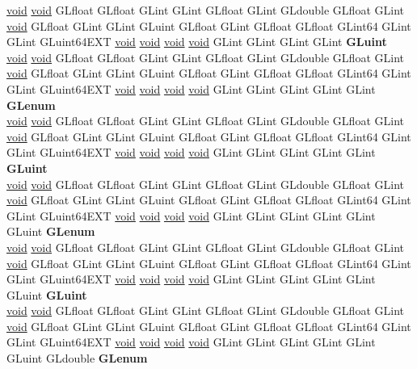 \begin{DoxyCompactItemize}
\begin{tabbing}
\>\hyperlink{interfacevoid}{void} \hyperlink{interfacevoid}{void} GLfloat GLfloat GLint GLint GLfloat GLint GLdouble GLfloat GLint \hyperlink{interfacevoid}{void} GLfloat GLint GLint GLuint GLfloat GLint GLfloat GLfloat GLint64 GLint GLint GLuint64EXT \hyperlink{interfacevoid}{void} \hyperlink{interfacevoid}{void} \hyperlink{interfacevoid}{void} \hyperlink{interfacevoid}{void} GLint GLint GLint GLint {\bfseries GLuint}\\
\>\hyperlink{interfacevoid}{void} \hyperlink{interfacevoid}{void} GLfloat GLfloat GLint GLint GLfloat GLint GLdouble GLfloat GLint \hyperlink{interfacevoid}{void} GLfloat GLint GLint GLuint GLfloat GLint GLfloat GLfloat GLint64 GLint GLint GLuint64EXT \hyperlink{interfacevoid}{void} \hyperlink{interfacevoid}{void} \hyperlink{interfacevoid}{void} \hyperlink{interfacevoid}{void} GLint GLint GLint GLint GLint {\bfseries GLenum}\\
\>\hyperlink{interfacevoid}{void} \hyperlink{interfacevoid}{void} GLfloat GLfloat GLint GLint GLfloat GLint GLdouble GLfloat GLint \hyperlink{interfacevoid}{void} GLfloat GLint GLint GLuint GLfloat GLint GLfloat GLfloat GLint64 GLint GLint GLuint64EXT \hyperlink{interfacevoid}{void} \hyperlink{interfacevoid}{void} \hyperlink{interfacevoid}{void} \hyperlink{interfacevoid}{void} GLint GLint GLint GLint GLint {\bfseries GLuint}\\
\>\hyperlink{interfacevoid}{void} \hyperlink{interfacevoid}{void} GLfloat GLfloat GLint GLint GLfloat GLint GLdouble GLfloat GLint \hyperlink{interfacevoid}{void} GLfloat GLint GLint GLuint GLfloat GLint GLfloat GLfloat GLint64 GLint GLint GLuint64EXT \hyperlink{interfacevoid}{void} \hyperlink{interfacevoid}{void} \hyperlink{interfacevoid}{void} \hyperlink{interfacevoid}{void} GLint GLint GLint GLint GLint GLuint {\bfseries GLenum}\\
\>\hyperlink{interfacevoid}{void} \hyperlink{interfacevoid}{void} GLfloat GLfloat GLint GLint GLfloat GLint GLdouble GLfloat GLint \hyperlink{interfacevoid}{void} GLfloat GLint GLint GLuint GLfloat GLint GLfloat GLfloat GLint64 GLint GLint GLuint64EXT \hyperlink{interfacevoid}{void} \hyperlink{interfacevoid}{void} \hyperlink{interfacevoid}{void} \hyperlink{interfacevoid}{void} GLint GLint GLint GLint GLint GLuint {\bfseries GLuint}\\
\>\hyperlink{interfacevoid}{void} \hyperlink{interfacevoid}{void} GLfloat GLfloat GLint GLint GLfloat GLint GLdouble GLfloat GLint \hyperlink{interfacevoid}{void} GLfloat GLint GLint GLuint GLfloat GLint GLfloat GLfloat GLint64 GLint GLint GLuint64EXT \hyperlink{interfacevoid}{void} \hyperlink{interfacevoid}{void} \hyperlink{interfacevoid}{void} \hyperlink{interfacevoid}{void} GLint GLint GLint GLint GLint GLuint GLdouble {\bfseries GLenum}\\

\end{tabbing}
\end{DoxyCompactItemize}
